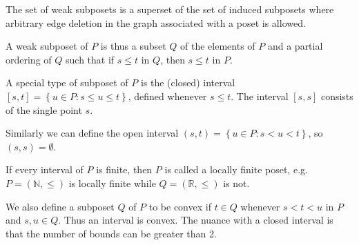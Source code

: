 
The set of weak subposets is a superset of the set of induced subposets where arbitrary edge deletion in the graph associated with a poset is allowed.


A weak subposet of $P$ is thus a subset $Q$ of the elements of $P$ and a partial ordering of $Q$ such that if $s \leq t$ in $Q$, then $s \leq t$ in $P$.



A special type of subposet of $P$ is the (closed) interval $[s, t] = \left\{{u \in P : s \leq u \leq t}\right\}$, defined whenever $s \leq t$. The interval $[s, s]$ consists of the single point $s$.


Similarly we can define the open interval $(s, t) = \left\{{u \in P : s < u < t}\right\}$, so $(s, s) = \emptyset$.

If every interval of $P$ is finite, then $P$ is called a locally finite poset, e.g. $P = (\mathbb{N}, \le)$ is locally finite while $Q = (\mathbb{R}, \le)$ is not.


We also define a subposet $Q$ of $P$ to be convex if $t \in Q$ whenever $s < t < u$ in $P$ and $s, u \in Q$. Thus an interval is convex. The nuance with a closed interval is that the number of bounds can be greater than 2.